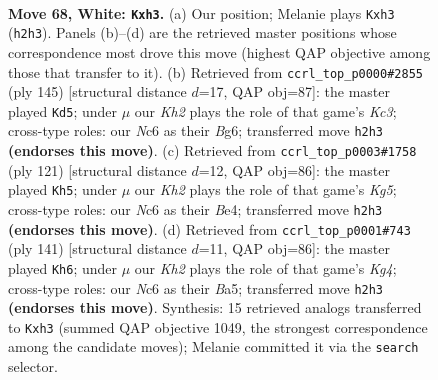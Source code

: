 \documentclass[11pt]{article}
\begin{document}
\clearpage

\begin{figure}[p]\centering
\begin{subfigure}{0.46\textwidth}\centering
\resizebox{\linewidth}{!}{%
\newchessgame
\chessboard[
  setfen={8/1R6/2Np4/8/5k2/5n1p/6pK/8 w - - 2 68},
  showmover=false,
  pgfstyle=straightmove, color=movearrow, markmove={h2-h3}
]}
\caption{}
\end{subfigure}\hfill
\begin{subfigure}{0.46\textwidth}\centering
\resizebox{\linewidth}{!}{%
\newchessgame
\chessboard[
  setfen={8/8/2k3b1/2P5/1P1N4/2K5/8/8 b - - 32 73},
  showmover=false,
  pgfstyle=straightmove, color=movearrow, markmove={c6-d5}
]}
\caption{}
\end{subfigure}
\\[4pt]
\begin{subfigure}{0.46\textwidth}\centering
\resizebox{\linewidth}{!}{%
\newchessgame
\chessboard[
  setfen={8/8/8/8/4b1kP/4N1P1/5K2/8 b - - 6 61},
  showmover=false,
  pgfstyle=straightmove, color=movearrow, markmove={g4-h5}
]}
\caption{}
\end{subfigure}\hfill
\begin{subfigure}{0.46\textwidth}\centering
\resizebox{\linewidth}{!}{%
\newchessgame
\chessboard[
  setfen={8/8/8/b5kP/4N1P1/5K2/8/8 b - - 14 71},
  showmover=false,
  pgfstyle=straightmove, color=movearrow, markmove={g5-h6}
]}
\caption{}
\end{subfigure}
\caption{\textbf{Move 68, White: \texttt{Kxh3}.} (a) Our position; Melanie plays \texttt{Kxh3} (\texttt{h2h3}). Panels (b)--(d) are the retrieved master positions whose correspondence most drove this move (highest QAP objective among those that transfer to it). (b) Retrieved from \texttt{ccrl\_top\_p0000\#2855} (ply 145) [structural distance $d$=17, QAP obj=87]: the master played \texttt{Kd5}; under $\mu$ our \emph{Kh2} plays the role of that game's \emph{Kc3}; cross-type roles: our \emph{N}c6 as their \emph{B}g6; transferred move \texttt{h2h3} \textbf{(endorses this move)}. (c) Retrieved from \texttt{ccrl\_top\_p0003\#1758} (ply 121) [structural distance $d$=12, QAP obj=86]: the master played \texttt{Kh5}; under $\mu$ our \emph{Kh2} plays the role of that game's \emph{Kg5}; cross-type roles: our \emph{N}c6 as their \emph{B}e4; transferred move \texttt{h2h3} \textbf{(endorses this move)}. (d) Retrieved from \texttt{ccrl\_top\_p0001\#743} (ply 141) [structural distance $d$=11, QAP obj=86]: the master played \texttt{Kh6}; under $\mu$ our \emph{Kh2} plays the role of that game's \emph{Kg4}; cross-type roles: our \emph{N}c6 as their \emph{B}a5; transferred move \texttt{h2h3} \textbf{(endorses this move)}. Synthesis: 15 retrieved analogs transferred to \texttt{Kxh3} (summed QAP objective 1049, the strongest correspondence among the candidate moves); Melanie committed it via the \texttt{search} selector.}
\label{fig:thought-m134}
\end{figure}
\end{document}
